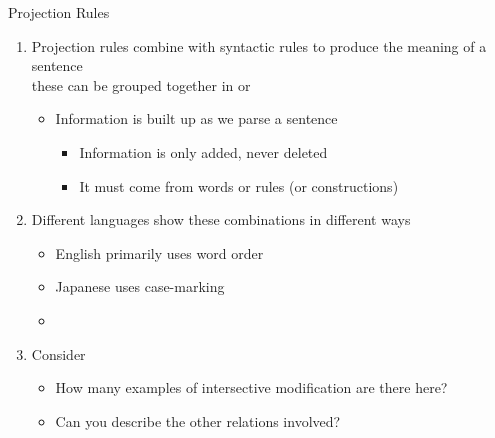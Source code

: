 \begin{frame}{Projection Rules}

\begin{enumerate}
\item Projection rules combine with syntactic rules to produce the
  meaning of a sentence
  \\ these can be grouped together in  or 
  \begin{itemize}
  \item Information is built up as we parse a sentence
    \begin{itemize}
    \item Information is only added, never deleted
    \item It must come from words or rules (or constructions)
    \end{itemize}
  \end{itemize}
\item Different languages show these combinations in different ways
  \begin{itemize}
  \item English primarily uses word order
  \item Japanese uses case-marking
  \item [\ldots{}]
  \end{itemize}
\item[?] Consider 
  \begin{itemize}
  \item How many examples of intersective modification are there here?\task
  \item Can you describe the other relations involved?\task
  \end{itemize}
  
\end{enumerate}

\end{frame}



